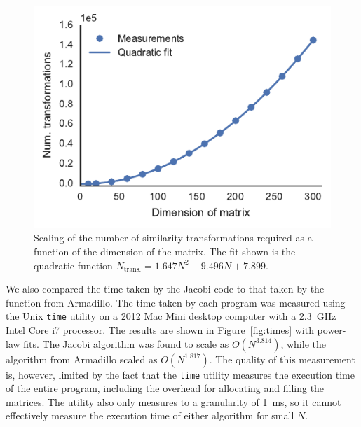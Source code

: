 \documentclass[aps,prc,reprint]{revtex4-1}
\begin{document}
        \begin{figure}
            \includegraphics{transformScaling.pdf}
            \caption{Scaling of the number of similarity transformations required as a function of the dimension of the matrix. The fit shown is the quadratic function $N_\text{trans.} = \num{1.647}N^2 - \num{9.496} N + \num{7.899}.$}
            \label{fig:transformScaling}
        \end{figure}

        We also compared the time taken by the Jacobi code to that taken by the function from Armadillo. The time taken by each program was measured using the Unix \texttt{time} utility on a 2012 Mac Mini desktop computer with a \SI{2.3}{GHz} Intel Core i7 processor. The results are shown in Figure~\ref{fig:times} with power-law fits. The Jacobi algorithm was found to scale as $O(N^{3.814})$, while the algorithm from Armadillo scaled as $O(N^{1.817})$. The quality of this measurement is, however, limited by the fact that the \texttt{time} utility measures the execution time of the entire program, including the overhead for allocating and filling the matrices. The utility also only measures to a granularity of \SI{1}{ms}, so it cannot effectively measure the execution time of either algorithm for small $N$.
\end{document}
